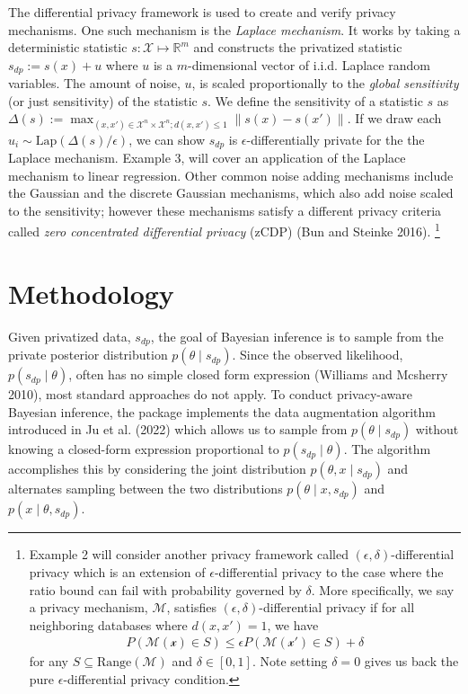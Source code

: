 The differential privacy framework is used to create and verify privacy
mechanisms. One such mechanism is the \emph{Laplace mechanism}. It works by
taking a deterministic statistic \(s: \mathcal{X} \mapsto \mathbb{R}^m\) and constructs
the privatized statistic \(s_{dp} := s(x) + u\) where \(u\) is a \(m\)-dimensional
vector of i.i.d. Laplace random variables. The amount of noise, \(u\), is scaled
proportionally to the \emph{global sensitivity} (or just sensitivity) of the statistic \(s\).
We define the sensitivity of a statistic \(s\) as
\(\Delta (s) := \max_{(x,x') \in \mathcal{X}^n \times \mathcal{X}^n; d(x,x') \leq 1} \|s(x) - s(x')\|\).
If we draw
each \(u_i \sim \text{Lap}(\Delta (s) / \epsilon)\), we can show \(s_{dp}\) is \(\epsilon\)-differentially private
for the the Laplace mechanism. Example 3, will cover an
application of the Laplace mechanism to linear regression.
Other common noise adding mechanisms include the Gaussian and the
discrete Gaussian mechanisms, which also add noise scaled to the sensitivity;
however these mechanisms satisfy a different privacy criteria called \emph{zero concentrated differential privacy} (zCDP) (Bun and Steinke 2016). \footnote{Example 2 will consider another privacy framework called \((\epsilon, \delta)\)-differential privacy which
  is an extension of \(\epsilon\)-differential privacy to the case where the ratio bound
  can fail with probability governed by \(\delta\). More specifically, we say
  a privacy mechanism, \(\mathcal{M}\), satisfies \((\epsilon, \delta)\)-differential privacy if
  for all neighboring databases where \(d(x,x') = 1\), we have
  \begin{align*}
  P(\mathcal{M(x)} \in S) \leq \epsilon P(\mathcal{M(x')} \in S) + \delta
  \end{align*}
  for any \(S \subseteq \text{Range}(\mathcal{M})\) and \(\delta \in [0,1]\). Note
  setting \(\delta = 0\) gives us back the pure \(\epsilon\)-differential privacy
  condition.}

\hypertarget{methodology}{%
\section{Methodology}\label{methodology}}

Given privatized data, \(s_{dp}\), the goal of Bayesian inference is to sample from the
private posterior distribution \(p(\theta \mid s_{dp})\). Since the observed likelihood,
\(p(s_{dp} \mid \theta)\), often has no simple closed form expression (Williams and Mcsherry 2010), most standard approaches
do not apply. To conduct privacy-aware Bayesian inference, the  package implements
the data augmentation algorithm introduced in Ju et al. (2022) which allows us to sample from \(p(\theta \mid s_{dp})\)
without knowing a closed-form expression proportional to \(p(s_{dp} \mid \theta)\).
The algorithm accomplishes this by considering the joint distribution \(p(\theta, x \mid s_{dp})\) and
alternates sampling between the two distributions \(p(\theta \mid x, s_{dp})\)
and \(p(x \mid \theta, s_{dp})\).

